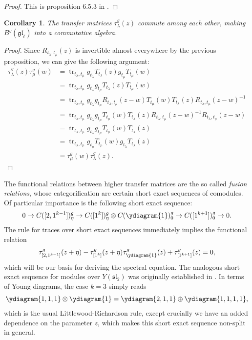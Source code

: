 \documentclass[11pt]{report}
\newtheorem{corollary}[theorem]{Corollary}
\theoremstyle{definition}
\theoremstyle{remark}
\theoremstyle{remark}
\begin{document}
\begin{proof}
This is proposition 6.5.3 in \cite{book:molev}.
\end{proof}

\begin{corollary}
The transfer matrices $\tau_\lambda^g(z)$ commute among each other, making $B^g(\mathfrak{gl}_\ell)$ into a commutative algebra.
\end{corollary}

\begin{proof}
Since $R_{t_\lambda,t_\mu}(z)$ is invertible almost everywhere by the previous proposition, we can give the following argument:
\begin{align*}
\tau_\lambda^g(z) \tau_\mu^g(w)
&= \operatorname{tr}_{t_\lambda,t_\mu} g_{t_\lambda} T_{t_\lambda}(z) g_{t_\mu} T_{t_\mu}(w) \\
&= \operatorname{tr}_{t_\lambda,t_\mu} g_{t_\lambda} g_{t_\mu} T_{t_\lambda}(z) T_{t_\mu}(w) \\
&= \operatorname{tr}_{t_\lambda,t_\mu} g_{t_\lambda} g_{t_\mu} R_{t_\lambda,t_\mu}(z-w) T_{t_\mu}(w) T_{t_\lambda}(z) R_{t_\lambda,t_\mu}(z-w)^{-1} \\
&= \operatorname{tr}_{t_\lambda,t_\mu} g_{t_\lambda} g_{t_\mu} T_{t_\mu}(w) T_{t_\lambda}(z) R_{t_\lambda,t_\mu}(z-w)^{-1} R_{t_\lambda,t_\mu}(z-w) \\
&= \operatorname{tr}_{t_\lambda,t_\mu} g_{t_\lambda} g_{t_\mu} T_{t_\mu}(w) T_{t_\lambda}(z) \\
&= \operatorname{tr}_{t_\lambda,t_\mu} g_{t_\mu} T_{t_\mu}(w) g_{t_\lambda} T_{t_\lambda}(z) \\
&= \tau_\mu^g(w) \tau_\lambda^g(z).
\end{align*}
\end{proof}

The functional relations between higher transfer matrices are the so called \emph{fusion relations}, whose categorification are certain short exact sequences of comodules. Of particular importance is the following short exact sequence:
\begin{equation*}
0 \to C([2,1^{k-1}])_\eta^g \to C([1^k])_\eta^g \otimes C(\ydiagram{1})_0^g \to C([1^{k+1}])_0^g \to 0.
\end{equation*}
The rule for traces over short exact sequences immediately implies the functional relation
\begin{equation*}\label{equation:functionalRelation}
\tau_{[2,1^{k-1}]}^g(z+\eta) - \tau_{[1^k]}^g(z+\eta) \tau_{\ydiagram{1}}^g(z) + \tau_{[1^{k+1}]}^g(z) = 0,
\end{equation*}
which will be our basis for deriving the spectral equation. The analogous short exact sequence for modules over $Y(\mathfrak{sl}_2)$ was originally established in \cite{article:chari:1990}. In terms of Young diagrams, the case $k=3$ simply reads
\begin{equation*}
\ydiagram{1,1,1} \otimes \ydiagram{1} = \ydiagram{2,1,1} \oplus \ydiagram{1,1,1,1},
\end{equation*}
which is the usual Littlewood-Richardson rule, except crucially we have an added dependence on the parameter $z$, which makes this short exact sequence non-split in general.
\end{document}
